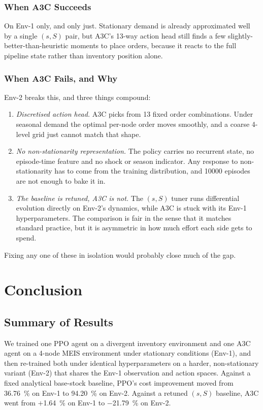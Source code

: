 \documentclass[letterpaper]{article} %
\begin{document}
\subsubsection{When A3C Succeeds}
On Env-1 only, and only just.  Stationary demand is already
approximated well by a single $(s,S)$ pair, but A3C's 13-way
action head still finds a few slightly-better-than-heuristic
moments to place orders, because it reacts to the full pipeline
state rather than inventory position alone.

\subsubsection{When A3C Fails, and Why}
Env-2 breaks this, and three things compound:
\begin{enumerate}
\item \emph{Discretised action head.}  A3C picks from 13 fixed
      order combinations.  Under seasonal demand the optimal
      per-node order moves smoothly, and a coarse 4-level grid
      just cannot match that shape.
\item \emph{No non-stationarity representation.}  The policy
      carries no recurrent state, no episode-time feature and no
      shock or season indicator.  Any response to
      non-stationarity has to come from the training
      distribution, and \num{10000} episodes are not enough to
      bake it in.
\item \emph{The baseline is retuned, A3C is not.}  The $(s,S)$
      tuner runs differential evolution directly on Env-2's
      dynamics, while A3C is stuck with its Env-1
      hyperparameters.  The comparison is fair in the sense that
      it matches standard practice, but it is asymmetric in how
      much effort each side gets to spend.
\end{enumerate}
Fixing any one of these in isolation would probably close much of
the gap.

\section{Conclusion}
\label{sec:conc}

\subsection{Summary of Results}
We trained one PPO agent on a divergent inventory environment
and one A3C agent on a 4-node MEIS environment under stationary
conditions (Env-1), and then re-trained both under identical
hyperparameters on a harder, non-stationary variant (Env-2) that
shares the Env-1 observation and action spaces.  Against a fixed
analytical base-stock baseline, PPO's cost improvement moved
from \SI{36.76}{\percent} on Env-1 to \SI{94.20}{\percent} on
Env-2.  Against a retuned $(s,S)$ baseline, A3C went from
$+$\SI{1.64}{\percent} on Env-1 to $-$\SI{21.79}{\percent} on
Env-2.
\end{document}
